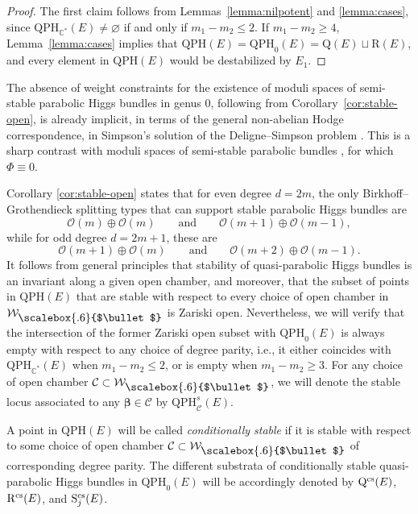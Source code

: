 \documentclass[10pt,a4paper]{amsart}
\newcommand{\field}[1]{\ensuremath{\mathbb{#1}}}
\newcommand{\CC}{\field{C}}
\newcommand{\calO}{\mathcal{O}}
\newcommand\sbul[1][.6]{\mathbin{\vcenter{\hbox{\scalebox{#1}{$\bullet$}}}}}
\newcommand{\qC}{\mathcal{C}}
\newcommand{\qW}{\mathcal{W}}
\numberwithin{equation}{section}
\begin{document}
\begin{proof}
The first claim follows from Lemmas~\ref{lemma:nilpotent} and \ref{lemma:cases}, since $\mathrm{QPH}_{\CC^{*}}(E)\neq\varnothing $ if and only if $m_{1}-m_{2}\leq 2$. If $m_{1}-m_{2} \geq 4$, Lemma~\ref{lemma:cases} implies that $\mathrm{QPH}(E) = \mathrm{QPH}_{0}(E) = \mathrm{Q}(E)\sqcup \mathrm{R}(E)$, and every element in $\mathrm{QPH}(E)$ would be destabilized by $E_{1}$.
\end{proof}

\begin{Remark}%
The absence of weight constraints for the existence of moduli spaces of semi-stable parabolic Higgs bundles in genus 0, following from Corollary~\ref{cor:stable-open}, is already implicit, in terms of the general non-abelian Hodge correspondence, in Simpson's solution of the Deligne--Simpson problem \cite{Sim92}. This is a sharp contrast with moduli spaces of semi-stable parabolic bundles \cite{Bau91, Bis98}, for which $\Phi\equiv 0$.
\end{Remark}

Corollary \ref{cor:stable-open} states that for even degree $d=2m$, the only Birkhoff--Grothendieck splitting types that can support stable parabolic Higgs bundles are
\[
\calO(m)\oplus \calO(m) \qquad\text{and}\qquad \calO(m+1)\oplus\calO(m-1),
\]
while for odd degree $d=2m+1$, these are
\[
\calO(m+1)\oplus \calO(m)\qquad\text{and}\qquad \calO(m+2)\oplus\calO(m-1).
\]
It follows from general principles that stability of quasi-parabolic Higgs bundles is an invariant along a given open chamber, and moreover, that the subset of points in $\mathrm{QPH}(E)$ that are stable with respect to every choice of open chamber in $\qW_{\sbul}$ is Zariski open. Nevertheless, we will verify that the intersection of the former Zariski open subset with $\mathrm{QPH}_{0}(E)$ is always empty with respect to any choice of degree parity, i.e., it either coincides with $\mathrm{QPH}_{\CC^{*}}(E)$ when $m_{1}-m_{2}\leq 2$, or is empty when $m_{1}-m_{2}\geq 3$. For any choice of open chamber $\qC\subset\qW_{\sbul}$, we will denote the stable locus associated to any $\pmb{\beta}\in\qC$ by $\mathrm{QPH}^{s}_{\qC}(E)$.


\begin{Definition}\label{def:cond-stab}
A point in $\mathrm{QPH}(E)$ will be called \textit{conditionally stable} if it is stable with respect to some choice of open chamber $\qC\subset\qW_{\sbul}$ of corresponding degree parity. The different substrata of conditionally stable quasi-parabolic Higgs bundles in $\mathrm{QPH}_{0}(E)$ will be accordingly denoted by $\mathrm{Q}^{\rm cs}(E)$, $\mathrm{R}^{\rm cs}(E)$, and $\mathrm{S}^{\rm cs}_{j}(E)$.
\end{Definition}
\end{document}

